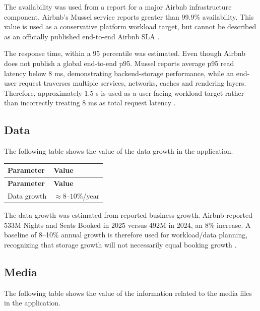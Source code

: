 The availability was used from a report for a major Airbnb infrastructure component. Airbnb's Mussel service 
reports greater than 99.9\% availability. This value is used as a conservative platform workload target, 
but cannot be described as an officially published end-to-end Airbnb SLA \cite{airbnb_engineering_mussel}.

The response time, within a 95 percentile was estimated. Even though Airbnb does not publish a global end-to-end 
p95. Mussel reports average p95 read latency below 8 ms, demonstrating backend-storage performance, while an end-user 
request traverses multiple services, networks, caches and rendering layers. Therefore, approximately 1.5 s is used 
as a user-facing workload target rather than incorrectly treating 8 ms as total request latency
\cite{airbnb_engineering_mussel,educative_airbnb_system_design}.

\subsection{Data}

The following table shows the value of the data growth in the application.

\begin{longtable}{|p{}|p{}|}
    \hline
    \textbf{Parameter} & 
    \textbf{Value} \\
    \hline
    \endfirsthead

    \hline
    \textbf{Parameter} & 
    \textbf{Value} \\
    \hline
    \endhead
    
    Data growth & 
    $\approx 8$--$10\%$/year \cite{airbnb_10k_2025} \\ 
    \hline 
    
\end{longtable}

The data growth was estimated from reported business growth. Airbnb reported 533M Nights and Seats Booked in 
2025 versus 492M in 2024, an 8\% increase. A baseline of 8--10\% annual growth is therefore used for workload/data 
planning, recognizing that storage growth will not necessarily equal booking growth \cite{airbnb_10k_2025}.


\subsection{Media}

The following table shows the value of the information related to the media files in the application.

